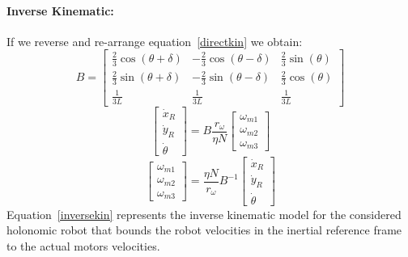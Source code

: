 \paragraph{Inverse Kinematic:} If we reverse and re-arrange equation~\ref{directkin} we obtain:
\begin{equation}
B = \begin{bmatrix}
\frac{2}{3}\cos(\theta+\delta) & -\frac{2}{3}\cos(\theta-\delta) & \frac{2}{3}\sin(\theta)\\
\frac{2}{3}\sin(\theta+\delta) & -\frac{2}{3}\sin(\theta-\delta) & \frac{2}{3}\cos(\theta)\\
\frac{1}{3L} & \frac{1}{3L} & \frac{1}{3L}
\end{bmatrix}
\end{equation}
\begin{equation}
\begin{bmatrix}
\dot{x}_R\\
\dot{y}_R\\
\dot{\theta}
\end{bmatrix} =
B
\frac{r_\omega}{\eta N}
\begin{bmatrix}
\omega_{m1}\\
\omega_{m2}\\
\omega_{m3}
\end{bmatrix}
\end{equation}
\begin{equation}
\begin{bmatrix}
\omega_{m1}\\
\omega_{m2}\\
\omega_{m3}
\end{bmatrix}=
\frac{\eta N}{r_\omega}B^{-1}
\begin{bmatrix}
\dot{x}_R\\
\dot{y}_R\\
\dot{\theta}
\end{bmatrix}
\label{inversekin}
\end{equation}
Equation~\ref{inversekin} represents the inverse kinematic model for the considered holonomic robot that bounds the robot velocities in the inertial reference frame to the actual motors velocities.
